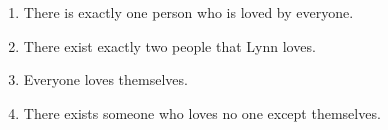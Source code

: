\begin{enumerate}
\begin{enumerate}
\item \strhard There is exactly one person who is loved by everyone.

\item \strhard There exist exactly two people that Lynn loves.

\item \streasy Everyone loves themselves.

\item \strmedium There exists someone who loves no one except themselves.
\end{enumerate}

%
%
%
%
%
%
%
%
%



\end{enumerate}



